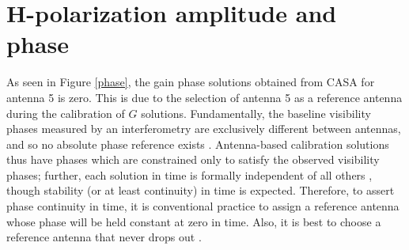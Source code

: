 \section{H-polarization amplitude and phase}
\label{Hp}
As seen in Figure \ref{phase}, the gain phase solutions obtained from CASA for antenna 5 is zero. This is due to the selection of antenna 5 as a reference antenna during the calibration of $G$ solutions. Fundamentally, the baseline visibility phases measured by an interferometry are exclusively different between antennas, and so no absolute phase reference exists \citep{taylor1999synthesis}. Antenna-based calibration solutions thus have phases which are constrained only to satisfy the observed visibility phases; further, each solution in time is formally independent of all others \citep{taylor1999synthesis}, though stability (or at least continuity) in time is expected. Therefore, to assert phase continuity in time, it is conventional practice to assign a reference antenna whose phase will be held constant at zero in time. Also, it is best to choose a reference antenna that never drops out \citep{editioncasa}. 


